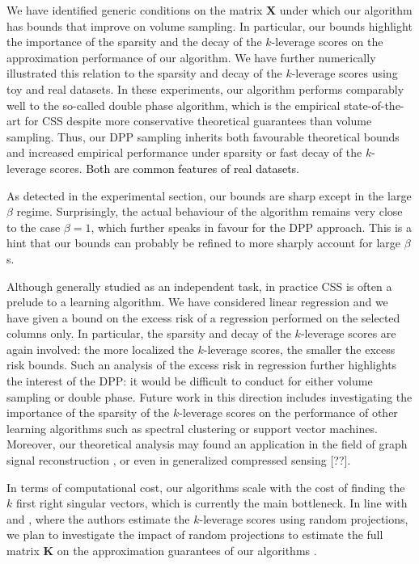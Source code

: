 \documentclass[twoside,11pt]{book}
\newcommand{\rev}[1]{\textcolor{black}{#1}}
\numberwithin{theorem}{chapter}
\numberwithin{definition}{chapter}
\numberwithin{proposition}{chapter}
\numberwithin{corollary}{chapter}
\numberwithin{example}{chapter}
\numberwithin{lemma}{chapter}
\numberwithin{assumption}{chapter}
\numberwithin{equation}{chapter}
\numberwithin{figure}{chapter}
\begin{document}
We have identified generic conditions on the matrix $\bm{X}$ under which our algorithm has bounds that improve on volume sampling. In particular, our bounds highlight the importance of the sparsity and the decay of the $k$-leverage scores on the approximation performance of our algorithm. We have further numerically illustrated this relation to the sparsity and decay of the $k$-leverage scores using toy and real datasets. In these experiments, our algorithm performs comparably well to the so-called double phase algorithm, which is the empirical state-of-the-art for CSS despite more conservative theoretical guarantees than volume sampling. Thus, our DPP sampling inherits both favourable theoretical bounds and increased empirical performance under sparsity or fast decay of the $k$-leverage scores. \rev{Both are common features of real datasets}.

As detected in the experimental section, our bounds are sharp except in the large $\beta$ regime. Surprisingly, the actual behaviour of the algorithm remains very close to the case $\beta=1$, which further speaks in favour for the DPP approach. This is a hint that our bounds can probably be refined to more sharply account for large $\beta$s.


Although generally studied as an independent task, in practice CSS is often a prelude to a learning algorithm. We have considered linear regression and we have given a bound on the excess risk of a regression performed on the selected columns only. In particular, the sparsity and decay of the $k$-leverage scores are again involved: the more localized the $k$-leverage scores, the smaller the excess risk bounds. Such an analysis of the excess risk in regression further highlights the interest of the DPP: it would be difficult to conduct for either volume sampling or double phase. Future work in this direction includes investigating the importance of the sparsity of the $k$-leverage scores on the performance of other learning algorithms such as spectral clustering or support vector machines. Moreover, our theoretical analysis may found an application in the field of graph signal reconstruction \parencite{TrAmBa17,PuTrGrVa18}, or even in generalized compressed sensing [??].


In terms of computational cost, our algorithms scale with the cost of finding the $k$ first right singular vectors, which is currently the main bottleneck. In line with \cite{DMMW12} and \cite{BoDrMI11}, where the authors estimate the $k$-leverage scores using random projections, we plan to investigate the impact of random projections to estimate the full matrix $\bm{K}$ on the approximation guarantees of our algorithms \parencite{MaZo08}.
\end{document}
